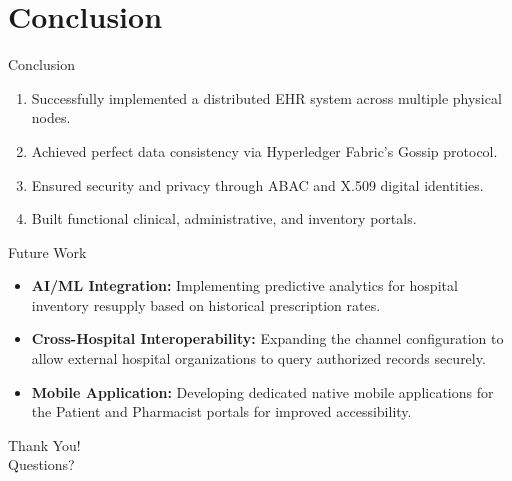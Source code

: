 \documentclass{beamer}
\begin{document}
\section{Conclusion}
\begin{frame}{Conclusion}
    \begin{enumerate}
        \item Successfully implemented a distributed EHR system across multiple physical nodes.
        \item Achieved perfect data consistency via Hyperledger Fabric's Gossip protocol.
        \item Ensured security and privacy through ABAC and X.509 digital identities.
        \item Built functional clinical, administrative, and inventory portals.
    \end{enumerate}
\end{frame}

\begin{frame}{Future Work}
    \begin{itemize}
        \item \textbf{AI/ML Integration:} Implementing predictive analytics for hospital inventory resupply based on historical prescription rates.
        \item \textbf{Cross-Hospital Interoperability:} Expanding the channel configuration to allow external hospital organizations to query authorized records securely.
        \item \textbf{Mobile Application:} Developing dedicated native mobile applications for the Patient and Pharmacist portals for improved accessibility.
    \end{itemize}
\end{frame}

\begin{frame}
    \centering
    \Huge Thank You! \\
    \vspace{20pt}
    \Large Questions?
\end{frame}
\end{document}
